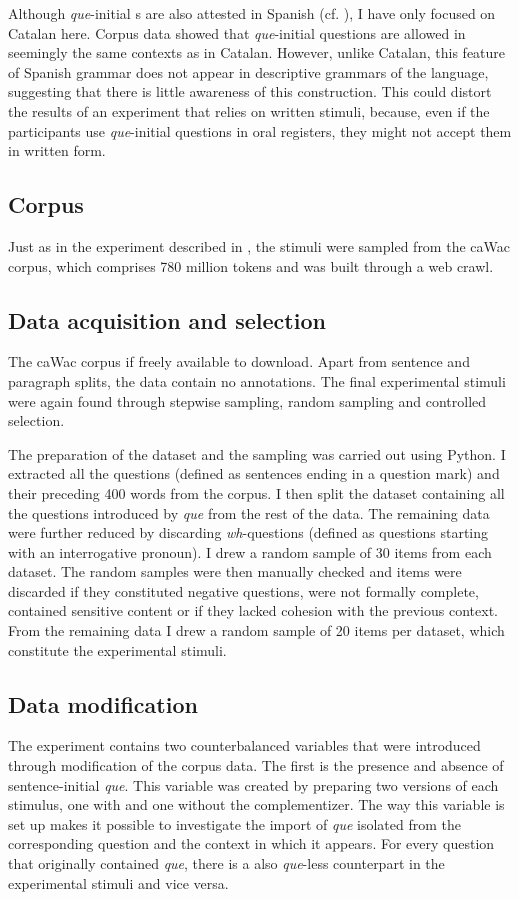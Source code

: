 Although \emph{que}-initial s are also attested in Spanish (cf. ), I have only focused  on Catalan here. Corpus data showed that \emph{que}-initial questions are allowed in seemingly the same contexts as in Catalan. However, unlike  Catalan, this feature of Spanish grammar does  not appear in descriptive grammars of the language, suggesting that there is little awareness of this construction. This could distort the results of an experiment that relies on written stimuli, because, even if the participants use  \emph{que}-initial questions in oral registers, they might not accept  them in written form.


\subsection{Corpus}
Just as in the experiment described in , the stimuli were sampled from the caWac corpus, which comprises 780 million tokens and was built through a web crawl. 
\subsection{Data acquisition and selection}
The caWac corpus if freely available to download. Apart from sentence and paragraph splits, the data  contain no  annotations. The final experimental stimuli were again found through stepwise sampling, random sampling and controlled selection.  

The preparation of the dataset and the sampling was carried out using Python. I extracted all the questions (defined as sentences ending in a question mark) and their preceding 400 words from the corpus. I then split the dataset containing all the questions introduced by \emph{que}  from the rest of the data. The remaining data were further reduced by discarding \textit{wh}-questions (defined as questions starting with an interrogative pronoun). 
I drew a random sample of 30 items from each dataset. The random samples were then  manually checked and items were discarded  if  they constituted negative questions, were  not formally complete, contained sensitive content or if they lacked cohesion with the previous context. From the remaining data I drew a random sample of 20 items per dataset, which  constitute the experimental stimuli.
\subsection{Data modification}
The experiment contains two counterbalanced variables that were introduced through modification of the corpus data. The first is the presence and absence of sentence-initial \emph{que}. This variable was created by preparing two versions of each stimulus, one with and one without the complementizer. 
The way this variable is set up makes it possible to investigate the import of \emph{que}  isolated from the corresponding question and the  context in which it appears. For every question that  originally contained \emph{que}, there is a also \emph{que}-less counterpart in the experimental stimuli and vice versa. 

